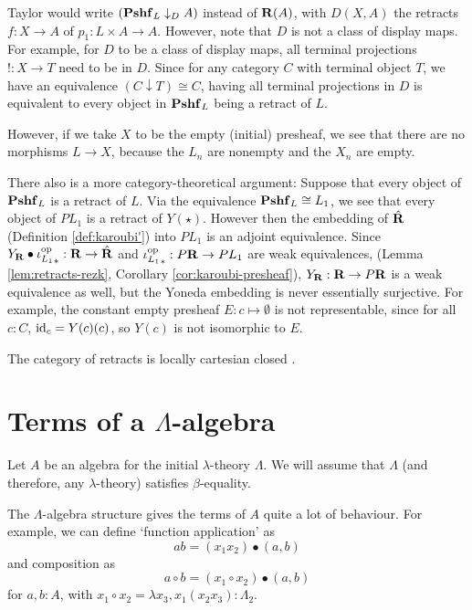 \begin{remark}
  Taylor would write $ (\mathbf{Pshf}_{L} \downarrow_D A) $ instead of $ \mathbf{R}(A) $, with $ D(X, A) $ the retracts $ f: X \to A $ of $ p_1 : L \times A \to A $. However, note that $ D $ is not a class of display maps. For example, for $ D $ to be a class of display maps, all terminal projections $ ! : X \to T $ need to be in $ D $. Since for any category $ C $ with terminal object $ T $, we have an equivalence $ (C \downarrow T) \cong C $, having all terminal projections in $ D $ is equivalent to every object in $ \mathbf{Pshf}_{L} $ being a retract of $ L $.

  However, if we take $ X $ to be the empty (initial) presheaf, we see that there are no morphisms $ L \to X $, because the $ L_n $ are nonempty and the $ X_n $ are empty.

  There also is a more category-theoretical argument: Suppose that every object of $ \mathbf{Pshf}_{L} $ is a retract of $ L $. Via the equivalence $ \mathbf{Pshf}_{L} \cong L_1 $, we see that every object of $ P L_1 $ is a retract of $ Y(\star) $. However then the embedding of $ \hat {\mathbf{R}} $ (Definition \ref{def:karoubi'}) into $ P L_1 $ is an adjoint equivalence. Since $ Y_{\mathbf{R}} \bullet {\ensuremath{\iota_{L_1}^{\text{op}}}}_* : \mathbf{R} \to \hat {\mathbf{R}} $ and $ {\iota_{L_1}^{\text{op}}}_* : P \mathbf{R} \to P L_1 $ are weak equivalences, (Lemma \ref{lem:retracts-rezk}, Corollary \ref{cor:karoubi-presheaf}), $ Y_{\mathbf{R}} : \mathbf{R} \to P \mathbf{R} $ is a weak equivalence as well, but the Yoneda embedding is never essentially surjective. For example, the constant empty presheaf $ E: c \mapsto \emptyset $ is not representable, since for all $ c : C $, $ \text{id}_{c} = Y(c)(c) $, so $ Y(c) $ is not isomorphic to $ E $.
\end{remark}

\begin{theorem}
  The category of retracts is locally cartesian closed \TODO.
\end{theorem}

\section{Terms of a \texorpdfstring{$ \Lambda $}{Lambda}-algebra}
Let $ A $ be an algebra for the initial $ \lambda $-theory $ \Lambda $. We will assume that $ \Lambda $ (and therefore, any $ \lambda $-theory) satisfies $ \beta $-equality.

The $ \Lambda $-algebra structure gives the terms of $ A $ quite a lot of behaviour. For example, we can define `function application' as
\[ a b = (x_1 x_2) \bullet (a, b) \]
and composition as
\[ a \circ b = (x_1 \circ x_2) \bullet (a, b) \]
for $ a, b : A $, with $ x_1 \circ x_2 = \lambda x_3, x_1 (x_2 x_3) : \Lambda_2 $.

